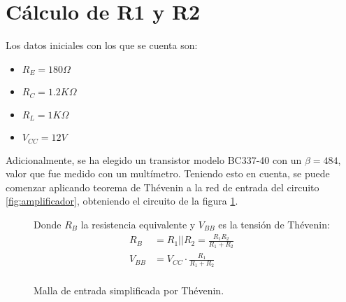 \documentclass[chaptersright]{informeutn}
\begin{document}
\section{Cálculo de R1 y R2}
    Los datos iniciales con los que se cuenta son:
    \begin{itemize}
        \item $R_E = 180\Omega$
        \item $R_C = 1.2K\Omega$
        \item $R_L = 1K\Omega$
        \item $V_{CC} = 12V$
    \end{itemize}
    Adicionalmente, se ha elegido un transistor modelo BC337-40 con un $\beta = 484$, valor que fue medido con un
    multímetro.
    Teniendo esto en cuenta, se puede comenzar aplicando teorema de Thévenin a la red de entrada del circuito
    \ref{fig:amplificador}, obteniendo el circuito de la figura \ref{fig:malla-entrada}.
    
    \begin{figure}[!ht]
        \centering
        \begin{minipage}{0.4\textwidth}
            \centering
            \caption{Malla de entrada simplificada por Thévenin.}
            \label{fig:malla-entrada}
        \end{minipage}%
        \begin{minipage}{0.4\textwidth}
            \centering
            Donde $R_{B}$ la resistencia equivalente y $V_{BB}$ es la tensión de Thévenin:
            \begin{align*}
                R_{B} &= R_1||R_2=\frac{R_1 R_2}{R_1 + R_2} \\
                V_{BB} &= V_{CC} \cdot \frac{R_1}{R_1 + R_2} \\
            \end{align*}
        \end{minipage}
    \end{figure}
\end{document}
